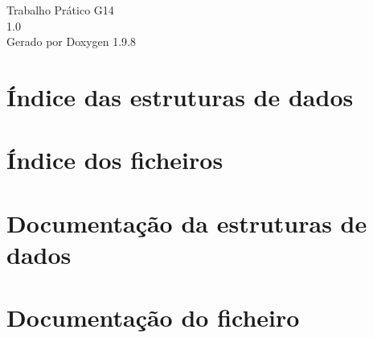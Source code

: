 \documentclass[twoside]{book}
\newcommand{\+}{\discretionary{\mbox{\scriptsize$\hookleftarrow$}}{}{}}
\newcommand{\clearemptydoublepage}{%
    \newpage{\pagestyle{empty}\cleardoublepage}%
  }
\begin{document}
  \raggedbottom
    \hypersetup{pageanchor=false,
                bookmarksnumbered=true,
                pdfencoding=unicode
               }
  \begin{titlepage}
  \vspace*{7cm}
  \begin{center}%
  {\Large Trabalho Prático G14}\\
  [1ex]\large 1.\+0 \\
  \vspace*{1cm}
  {\large Gerado por Doxygen 1.9.8}\\
  \end{center}
  \end{titlepage}
  \clearemptydoublepage
  \tableofcontents
  \clearemptydoublepage
  \hypersetup{pageanchor=true}

\chapter{Índice das estruturas de dados}

\chapter{Índice dos ficheiros}

\chapter{Documentação da estruturas de dados}






\chapter{Documentação do ficheiro}


























  \backmatter
  \newpage
\end{document}
